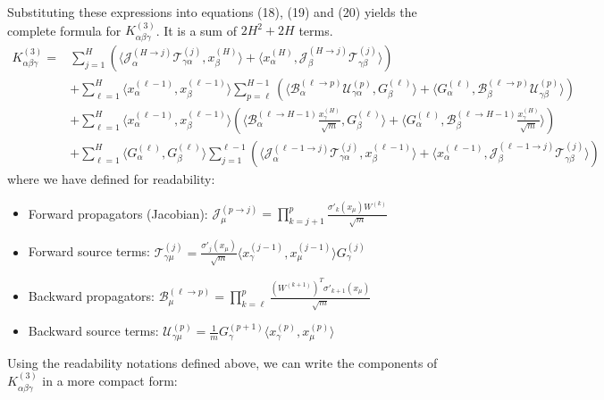 \documentclass[11pt,a4paper]{article}
\theoremstyle{definition}
\begin{document}
Substituting these expressions into equations (18), (19) and (20) yields the complete formula for $K^{(3)}_{\alpha\beta\gamma}$. It is a sum of $2H^2 + 2H$ terms.
\begin{align}
K^{(3)}_{\alpha\beta\gamma} = & \sum_{j=1}^{H} \left( \langle \mathcal{J}^{(H \to j)}_{\alpha} \mathcal{T}^{(j)}_{\gamma\alpha}, x^{(H)}_\beta \rangle + \langle x^{(H)}_\alpha, \mathcal{J}^{(H \to j)}_{\beta} \mathcal{T}^{(j)}_{\gamma\beta} \rangle \right) \nonumber \\
& + \sum_{\ell=1}^{H} \langle x^{(\ell-1)}_\alpha, x^{(\ell-1)}_\beta \rangle \sum_{p=\ell}^{H-1} \left( \langle \mathcal{B}^{(\ell \to p)}_{\alpha} \mathcal{U}^{(p)}_{\gamma\alpha}, G^{(\ell)}_\beta \rangle + \langle G^{(\ell)}_\alpha, \mathcal{B}^{(\ell \to p)}_{\beta} \mathcal{U}^{(p)}_{\gamma\beta} \rangle \right) \nonumber \\
& + \sum_{\ell=1}^{H} \langle x^{(\ell-1)}_\alpha, x^{(\ell-1)}_\beta \rangle \left( \langle \mathcal{B}^{(\ell \to H-1)}_{\alpha} \frac{x^{(H)}_\gamma}{\sqrt{m}}, G^{(\ell)}_\beta \rangle + \langle G^{(\ell)}_\alpha, \mathcal{B}^{(\ell \to H-1)}_{\beta} \frac{x^{(H)}_\gamma}{\sqrt{m}} \rangle \right) \nonumber \\
& + \sum_{\ell=1}^{H} \langle G^{(\ell)}_\alpha, G^{(\ell)}_\beta \rangle \sum_{j=1}^{\ell-1} \left( \langle \mathcal{J}^{(\ell-1 \to j)}_{\alpha} \mathcal{T}^{(j)}_{\gamma\alpha}, x^{(\ell-1)}_\beta \rangle + \langle x^{(\ell-1)}_\alpha, \mathcal{J}^{(\ell-1 \to j)}_{\beta} \mathcal{T}^{(j)}_{\gamma\beta} \rangle \right)
\end{align}
where we have defined for readability:
\begin{itemize}
    \item Forward propagators (Jacobian): $\mathcal{J}^{(p \to j)}_{\mu} = \prod_{k=j+1}^{p} \frac{\sigma'_{k}(x_\mu) W^{(k)}}{\sqrt{m}}$
    \item Forward source terms: $\mathcal{T}^{(j)}_{\gamma\mu} = \frac{\sigma'_{j}(x_\mu)}{\sqrt{m}} \langle x^{(j-1)}_\gamma, x^{(j-1)}_\mu \rangle G^{(j)}_\gamma$
    \item Backward propagators: $\mathcal{B}^{(\ell \to p)}_{\mu} = \prod_{k=\ell}^{p} \frac{(W^{(k+1)})^T \sigma'_{k+1}(x_\mu)}{\sqrt{m}}$
    \item Backward source terms: $\mathcal{U}^{(p)}_{\gamma\mu} = \frac{1}{m} G^{(p+1)}_\gamma \langle x^{(p)}_\gamma, x^{(p)}_\mu \rangle$
\end{itemize}

Using the readability notations defined above, we can write the components of $K^{(3)}_{\alpha\beta\gamma}$ in a more compact form:
\end{document}
